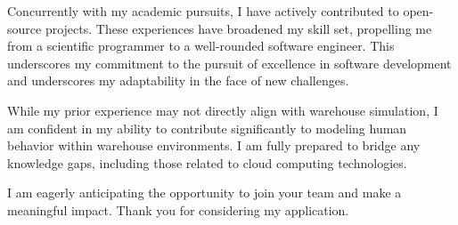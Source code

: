 \documentclass[11pt, a4paper]{awesome-cv}
\begin{document}
\begin{cvletter}
Concurrently with my academic pursuits, I have actively contributed to open-source projects. These experiences have broadened my skill set, propelling me from a scientific programmer to a well-rounded software engineer. This underscores my commitment to the pursuit of excellence in software development and underscores my adaptability in the face of new challenges.

While my prior experience may not directly align with warehouse simulation, I am confident in my ability to contribute significantly to modeling human behavior within warehouse environments. I am fully prepared to bridge any knowledge gaps, including those related to cloud computing technologies.

I am eagerly anticipating the opportunity to join your team and make a meaningful impact. Thank you for considering my application.

\end{cvletter}


\makeletterclosing
\end{document}
